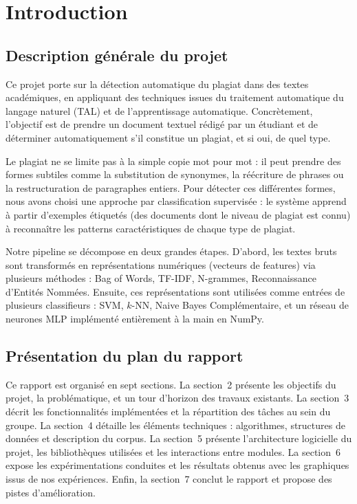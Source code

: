 \documentclass[12pt,a4paper]{article}
\begin{document}
\newpage
\tableofcontents
\newpage


\section{Introduction}

\subsection{Description générale du projet}

Ce projet porte sur la détection automatique du plagiat dans des textes académiques, en appliquant des techniques issues du traitement automatique du langage naturel (TAL) et de l'apprentissage automatique. Concrètement, l'objectif est de prendre un document textuel rédigé par un étudiant et de déterminer automatiquement s'il constitue un plagiat, et si oui, de quel type.

Le plagiat ne se limite pas à la simple copie mot pour mot : il peut prendre des formes subtiles comme la substitution de synonymes, la réécriture de phrases ou la restructuration de paragraphes entiers. Pour détecter ces différentes formes, nous avons choisi une approche par classification supervisée : le système apprend à partir d'exemples étiquetés (des documents dont le niveau de plagiat est connu) à reconnaître les patterns caractéristiques de chaque type de plagiat.

Notre pipeline se décompose en deux grandes étapes. D'abord, les textes bruts sont transformés en représentations numériques (vecteurs de features) via plusieurs méthodes : Bag of Words, TF-IDF, N-grammes, Reconnaissance d'Entités Nommées. Ensuite, ces représentations sont utilisées comme entrées de plusieurs classifieurs : SVM, $k$-NN, Naive Bayes Complémentaire, et un réseau de neurones MLP implémenté entièrement à la main en NumPy.

\subsection{Présentation du plan du rapport}

Ce rapport est organisé en sept sections. La section~2 présente les objectifs du projet, la problématique, et un tour d'horizon des travaux existants. La section~3 décrit les fonctionnalités implémentées et la répartition des tâches au sein du groupe. La section~4 détaille les éléments techniques : algorithmes, structures de données et description du corpus. La section~5 présente l'architecture logicielle du projet, les bibliothèques utilisées et les interactions entre modules. La section~6 expose les expérimentations conduites et les résultats obtenus avec les graphiques issus de nos expériences. Enfin, la section~7 conclut le rapport et propose des pistes d'amélioration.
\end{document}
